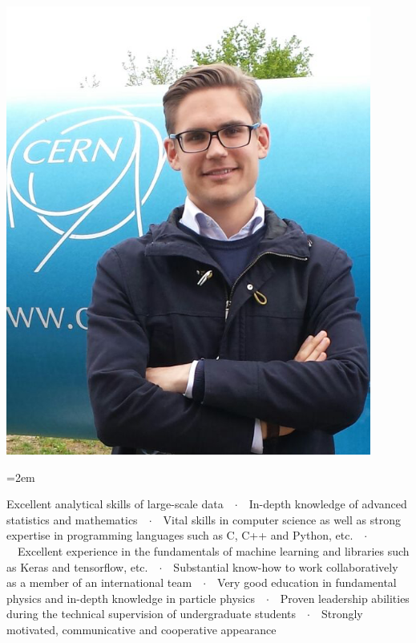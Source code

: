 \documentclass[xcolor=dvipsnames]{scrartcl}
\newcommand{\Description}[1]{\hangindent=2em\hangafter=0\noindent\raggedright\footnotesize{#1}\par\normalsize\vspace{1em}} %
\begin{document}
\begin{cv}{}
\begin{minipage}{0.7\textwidth}
\end{minipage}
\begin{minipage}{0.25\textwidth}%
  \includegraphics[width=0.9\textwidth]{dhandl.png}
\end{minipage}


\vspace{1em} %

\noindent{}\vspace{0.5em} %

\Description{Excellent analytical skills of large-scale data\ \ $\cdotp$\ \ In-depth knowledge of advanced statistics and mathematics\ \ $\cdotp$\ \ Vital skills in computer science as well as strong expertise in programming languages such as C, C++ and Python, etc.\ \ $\cdotp$\ \ Excellent experience in the fundamentals of machine learning and libraries such as Keras and tensorflow, etc.\ \ $\cdotp$\ \ Substantial know-how to work collaboratively as a member of an international team\ \ $\cdotp$\ \ Very good education in fundamental physics and in-depth knowledge in particle physics\ \ $\cdotp$\ \ Proven leadership abilities during the technical supervision of undergraduate students\ \ $\cdotp$\ \ Strongly motivated, communicative and cooperative appearance}\vspace{1em} %


\end{cv}
\end{document}
